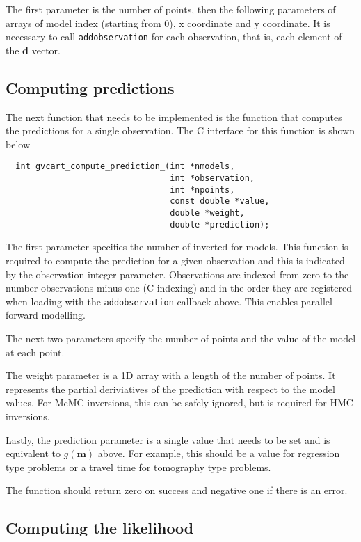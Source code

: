 \documentclass[a4paper,12pt]{article}
\begin{document}
The first parameter is the number of points, then the following parameters
of arrays of model index (starting from 0), x coordinate and y coordinate.
It is necessary to call \texttt{addobservation} for each observation, that
is, each element of the $\mathbf{d}$ vector.

\subsection{Computing predictions}

The next function that needs to be implemented is the function that
computes the predictions for a single observation. The C interface for
this function is shown below


\begin{verbatim}
  int gvcart_compute_prediction_(int *nmodels,
                                 int *observation,
                                 int *npoints, 
                                 const double *value,
                                 double *weight,
                                 double *prediction);
\end{verbatim}

The first parameter specifies the number of inverted for models. This
function is required to compute the prediction for a given observation
and this is indicated by the observation integer parameter. Observations
are indexed from zero to the number observations minus one (C indexing) and
in the order they are registered when loading with the \texttt{addobservation}
callback above. This enables parallel forward modelling.

The next two parameters specify the number of points and the value of
the model at each point.

The weight parameter is a 1D array with a length of the number of points. It
represents the partial deriviatives of the prediction with respect to the
model values. For McMC inversions, this can be safely ignored, but is required
for HMC inversions.

Lastly, the prediction parameter is a single value that needs to be set and
is equivalent to $g(\mathbf{m})$ above. For example, this should be a value for
regression type problems or a travel time for tomography type problems.

The function should return zero on success and negative one if there
is an error.

\subsection{Computing the likelihood}
\end{document}
